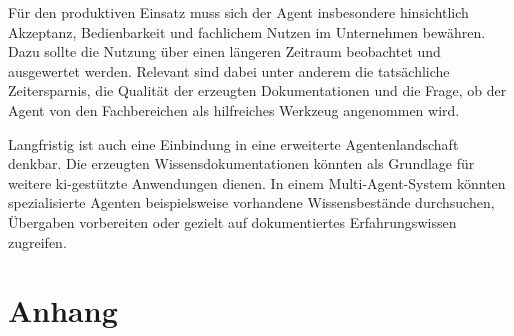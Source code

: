 \documentclass[
  10pt,
  ngerman,
  a4paper,
  toc=graduated,
  numbers=noenddot,
  headings=standardclasses,
  nonumberlist
]{scrartcl}
\begin{document}
Für den produktiven Einsatz muss sich der Agent insbesondere hinsichtlich Akzeptanz, Bedienbarkeit und fachlichem Nutzen im Unternehmen bewähren. Dazu sollte die Nutzung über einen längeren Zeitraum beobachtet und ausgewertet werden. Relevant sind dabei unter anderem die tatsächliche Zeitersparnis, die Qualität der erzeugten Dokumentationen und die Frage, ob der Agent von den Fachbereichen als hilfreiches Werkzeug angenommen wird.

Langfristig ist auch eine Einbindung in eine erweiterte Agentenlandschaft denkbar. Die erzeugten Wissensdokumentationen könnten als Grundlage für weitere \gls{ki}-gestützte Anwendungen dienen. In einem Multi-Agent-System könnten spezialisierte Agenten beispielsweise vorhandene Wissensbestände durchsuchen, Übergaben vorbereiten oder gezielt auf dokumentiertes Erfahrungswissen zugreifen.

\newpage
{}

\begingroup
\raggedright


\endgroup




\newpage
\appendix

\setcounter{page}{1}

\section*{Anhang}

\makeatletter
{}
\makeatother

\setcounter{section}{1}
\setcounter{subsection}{0}



\end{document}
